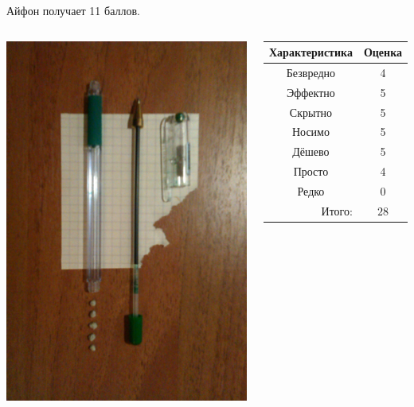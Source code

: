 Айфон получает 11 баллов.

\begin{frame}  %
    \begin{columns}
            \begin{center}
                \includegraphics[width=.8\textwidth]{fig/airpipe}
            \end{center}
            
            \begin{center}
                \begin{tabular}{c|c}
                    \hline\hline
                    Характеристика              & Оценка\\ \hline\hline
                    Безвредно                   & 4 \\
                    Эффектно                    & 5 \\
                    Скрытно                     & 5 \\
                    Носимо                      & 5 \\
                    Дёшево                      & 5 \\
                    Просто                      & 4 \\ 
                    Редко                       & 0 \\ \hline
                    \multicolumn{1}{r|}{Итого:} & $28$ \\
                \end{tabular}
            \end{center}
    \end{columns}    
\end{frame}

